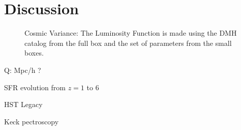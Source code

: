 \section{Discussion}

\begin{figure}
\caption{Cosmic Variance: The Luminosity Function is made using the DMH catalog 
from the full box and the set of parameters from the small boxes.}
\label{graph_cosmic_variance}
\end{figure}

Q: Mpc/h ?

\citep{lundgren14} SFR evolution from $z=1$ to $6$

\citep{bouwens14} HST Legacy

\citep{jiang11} Keck pectroscopy